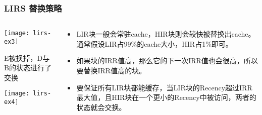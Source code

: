 \begin{frame}[plain]
	\frametitle{LIRS 替换策略}
	\begin{columns}
		\begin{column}{.5\textwidth}
			\centering
			\texttt{[image: lirs-ex3]}
			
			E被换掉，D与B的状态进行了交换 
			
			\texttt{[image: lirs-ex4]}
		\end{column}
		
		\begin{column}{.5\textwidth}
			
			\begin{itemize}

				\item  LIR块一般会常驻cache，HIR块则会较快被替换出cache。通常假设LIR占99\%的cache大小，HIR占1\%即可。 
				\item 如果块的IRR值高，那么它的下一次IRR值也会很高，所以要替换IRR值高的块。
				\item 要保证所有LIR块都能缓存，当LIR块的Recency超过IRR最大值，且HIR块在一个更小的Recency中被访问，两者的状态就会交换。
				
				
			\end{itemize}
			
		\end{column}
		
		
	\end{columns}
\end{frame}




